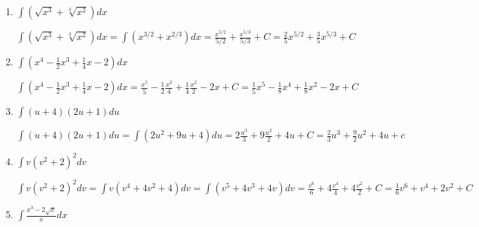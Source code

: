\begin{enumerate}[1.]
\item
\begin{Question}
$\int (\sqrt{x^3} + \sqrt[3]{x^2}) dx$
\end{Question}

\begin{Solution}
  $\int (\sqrt{x^3} + \sqrt[3]{x^2}) dx = 
  \int (x^{3/2} + x^{2/3})dx =
  \frac{x^{5/2}}{5/2} + \frac{x^{5/3}}{5/3} + C =
  \frac{2}{5} x^{5/2} + \frac{3}{5} x^{5/3} + C$
    
\end{Solution}
      
\item
\begin{Question}
  $\int (x^4 - \frac{1}{2} x^3 + \frac{1}{4} x - 2) dx$
\end{Question}

\begin{Solution}
  $\int (x^4 - \frac{1}{2} x^3 + \frac{1}{4} x - 2) dx = \frac{x^5}{5}
  - \frac{1}{2} \frac{x^2}{4} + \frac{1}{4} \frac{x^2}{2} - 2x + C =
  \frac{1}{5} x^5 - \frac{1}{8} x^4 + \frac{1}{8} x^2 - 2x + C$
    
\end{Solution}
      
      
\item
\begin{Question}
  $\int (u + 4)(2u + 1) du$
\end{Question}

\begin{Solution}
  $\int (u + 4)(2u + 1) du =
  \int (2u^2 + 9u + 4)du = 
  2 \frac{u^3}{3} + 9 \frac{u^2}{2} + 4u + C =
  \frac{2}{3} u^3 + \frac{9}{2} u^2 + 4u + c$
\end{Solution}

\item
\begin{Question}
    $\int v (v^2 + 2)^2 dv$
    
\end{Question}

\begin{Solution}
  $\int v (v^2 + 2)^2 dv = \int v(v^4 + 4v^2 + 4)dv = \int (v^5 + 4v^3
  + 4v)dv = \frac{v^6}{6} + 4 \frac{v^4}{4} + 4 \frac{v^2}{2} + C =
  \frac{1}{6} v^6 + v^4 + 2 v^2 + C$
    
\end{Solution}
      
      
\item
\begin{Question}
    $\int \frac{x^3 - 2 \sqrt{x}}{x} dx$
    

\end{Question}
\end{enumerate}
